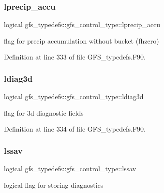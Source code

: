 \mbox{\label{structgfs__typedefs_1_1gfs__control__type_a9a50c2a74f6bd5c6aeb4aed783643398}} 
\subsubsection{lprecip\+\_\+accu}
{\footnotesize\ttfamily logical gfs\+\_\+typedefs\+::gfs\+\_\+control\+\_\+type\+::lprecip\+\_\+accu}



flag for precip accumulation without bucket (fhzero) 



Definition at line 333 of file G\+F\+S\+\_\+typedefs.\+F90.

\mbox{\label{structgfs__typedefs_1_1gfs__control__type_a011d81b1a1a625ac4453dfaada09db2e}} 
\subsubsection{ldiag3d}
{\footnotesize\ttfamily logical gfs\+\_\+typedefs\+::gfs\+\_\+control\+\_\+type\+::ldiag3d}



flag for 3d diagnostic fields 



Definition at line 334 of file G\+F\+S\+\_\+typedefs.\+F90.

\mbox{\label{structgfs__typedefs_1_1gfs__control__type_ad8e78a28467bd6189ca31164ec5bf1e3}} 
\subsubsection{lssav}
{\footnotesize\ttfamily logical gfs\+\_\+typedefs\+::gfs\+\_\+control\+\_\+type\+::lssav}



logical flag for storing diagnostics 



